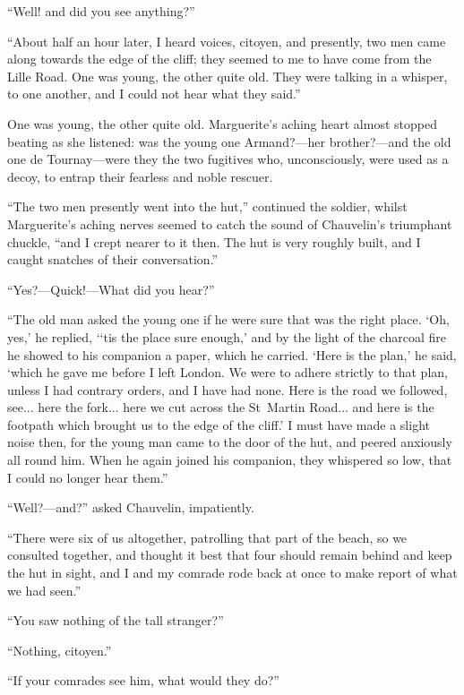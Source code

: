 \enquote{Well! and did you see anything?}

\enquote{About half an hour later, I heard voices, citoyen, and presently, two men came along towards the edge of the cliff; they seemed to me to have come from the Lille Road. One was young, the other quite old. They were talking in a whisper, to one another, and I could not hear what they said.}

One was young, the other quite old. Marguerite's aching heart almost stopped beating as she listened: was the young one Armand?---her brother?---and the old one de Tournay---were they the two fugitives who, unconsciously, were used as a decoy, to entrap their fearless and noble rescuer.

\enquote{The two men presently went into the hut,} continued the soldier, whilst Marguerite's aching nerves seemed to catch the sound of Chauvelin's triumphant chuckle, \enquote{and I crept nearer to it then. The hut is very roughly built, and I caught snatches of their conversation.}

\enquote{Yes?---Quick!---What did you hear?}

\enquote{The old man asked the young one if he were sure that was the right place. \enquote{Oh, yes,} he replied, \enquote{`tis the place sure enough,} and by the light of the charcoal fire he showed to his companion a paper, which he carried. \enquote{Here is the plan,} he said, \enquote{which he gave me before I left London. We were to adhere strictly to that plan, unless I had contrary orders, and I have had none. Here is the road we followed, see... here the fork... here we cut across the St~Martin Road... and here is the footpath which brought us to the edge of the cliff.} I must have made a slight noise then, for the young man came to the door of the hut, and peered anxiously all round him. When he again joined his companion, they whispered so low, that I could no longer hear them.}

\enquote{Well?---and?} asked Chauvelin, impatiently.

\enquote{There were six of us altogether, patrolling that part of the beach, so we consulted together, and thought it best that four should remain behind and keep the hut in sight, and I and my comrade rode back at once to make report of what we had seen.}

\enquote{You saw nothing of the tall stranger?}

\enquote{Nothing, citoyen.}

\enquote{If your comrades see him, what would they do?}

